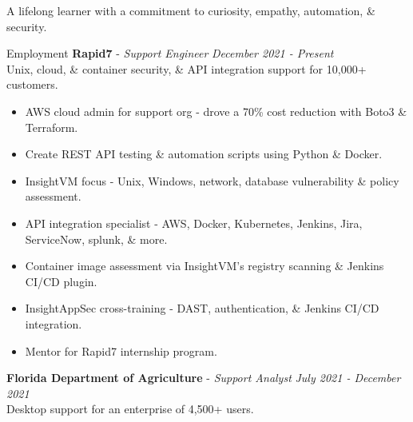 \documentclass{resume} %
\begin{document}
	\begin{center}{\vspace{-0.1cm}A lifelong learner with a commitment to curiosity, empathy, automation, \& security.\vspace{-0.1cm}}\end{center}
{\small
	\vspace{-0.2cm}
	\begin{rSection}{Employment}
		\vspace{-0.2cm}
		{\bf Rapid7} - {\em Support Engineer} \hfill {\em December 2021 - Present}\\
		Unix, cloud, \& container security, \& API integration support for 10,000+ customers. 
		\begin{itemize}
			\vspace{-0.2cm} \item AWS cloud admin for support org - drove a 70\% cost reduction with Boto3 \& Terraform.
			\vspace{-0.2cm} \item Create REST API testing \& automation scripts using Python \& Docker.
			\vspace{-0.2cm} \item InsightVM focus - Unix, Windows, network, database vulnerability \& policy assessment.
			\vspace{-0.2cm} \item API integration specialist - AWS, Docker, Kubernetes, Jenkins, Jira, ServiceNow, splunk, \& more.
			\vspace{-0.2cm} \item Container image assessment via InsightVM's registry scanning \& Jenkins CI/CD plugin.
			\vspace{-0.2cm} \item InsightAppSec cross-training - DAST, authentication, \& Jenkins CI/CD integration.
			\vspace{-0.2cm} \item Mentor for Rapid7 internship program.
		\end{itemize}
		{\bf Florida Department of Agriculture} - {\em Support Analyst} \hfill {\em July 2021 - December 2021}\\
		Desktop support for an enterprise of 4,500+ users.
		

\end{rSection}}
\end{document}
